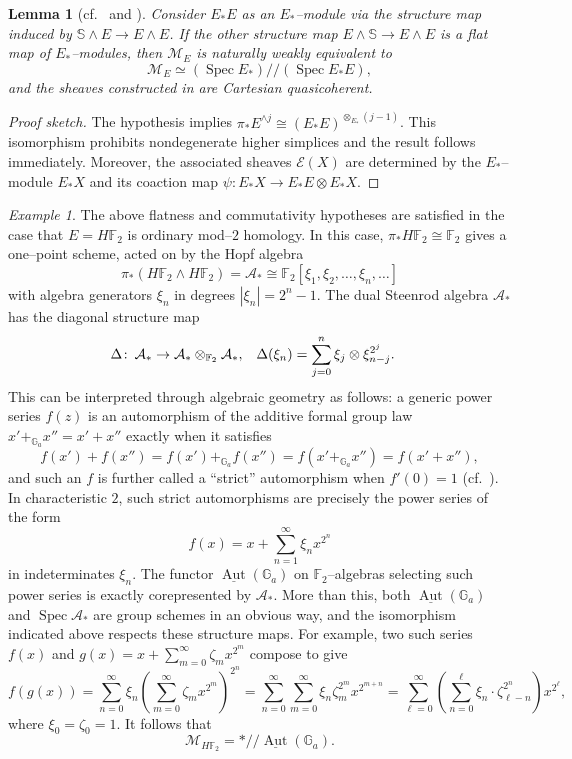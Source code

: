 \documentclass{amsart}
\renewcommand{\S}{\mathbb S}
\newcommand{\F}{\mathbb F}
\newcommand{\G}{\mathbb G}
\newcommand{\<}{\langle}
\renewcommand{\>}{\rangle}
\newcommand{\sm}{\wedge}
\newcommand{\mmod}{/\!\!/}
\newcommand{\co}{\colon\thinspace}
\newcommand{\sheaf}[1]{\mathcal{#1}}
\DeclareMathOperator{\Spec}{Spec}
\DeclareMathOperator{\Aut}{Aut}
\theoremstyle{plain}
\newtheorem*{lemma}{Lemma}
\theoremstyle{definition}
\theoremstyle{remark}
\newtheorem*{example}{Example}
\begin{document}
\begin{lemma}[{cf.\ \cite[Theorems 13.75 and 17.8]{Switzer} and \cite[Tag 07TP]{stacks-project}}]\label{FlatnessLemma}
Consider $E_* E$ as an $E_*$--module via the structure map induced by $\S \sm E \to E \sm E$.  If the other structure map $E \sm \S \to E \sm E$ is a flat map of $E_*$--modules, then $\mathcal{M}_E$ is naturally weakly equivalent to \[\mathcal{M}_E \simeq (\Spec E_*) \mmod (\Spec E_* E),\] and the sheaves constructed in  are \emph{Cartesian} quasicoherent.
\end{lemma}
\begin{proof}[Proof sketch]
The hypothesis implies $\pi_* E^{\sm j} \cong (E_* E)^{\otimes_{E_*} (j-1)}$.  This isomorphism prohibits nondegenerate higher simplices and the result follows immediately.  Moreover, the associated sheaves $\sheaf E(X)$ are determined by the $E_*$--module $E_* X$ and its coaction map $\psi: E_* X \to E_* E \otimes E_* X$.
\end{proof}

\begin{example}\label{HF2StackExample}
The above flatness and commutativity hypotheses are satisfied in the case that $E = H\F_2$ is ordinary mod--$2$ homology.  In this case, $\pi_* H\F_2 \cong \F_2$ gives a one--point scheme, acted on by the Hopf algebra \[\pi_* (H\F_2 \sm H\F_2) = \mathcal{A}_* \cong \F_2[\xi_1, \xi_2, \ldots, \xi_n, \ldots]\] with algebra generators $\xi_n$ in degrees $|\xi_n| = 2^n - 1$.  The dual Steenrod algebra $\mathcal{A}_*$ has the diagonal structure map~\cite[Theorem 3]{Milnor}
\begin{align*}
\Delta \co \mathcal{A}_* \to \mathcal{A}_* \otimes_{\F_2} \mathcal{A}_*, & & \Delta(\xi_n) & = \sum_{j=0}^n \xi_j \otimes \xi_{n-j}^{2^j}.
\end{align*}
This can be interpreted through algebraic geometry as follows: a generic power series $f(z)$ is an automorphism of the additive formal group law $x' +_{\G_a} x'' = x' + x''$ exactly when it satisfies \[f(x') + f(x'') = f(x') +_{\G_a} f(x'') = f\left( x' +_{\G_a} x'' \right) = f(x' + x''),\] and such an $f$ is further called a ``strict'' automorphism when $f'(0) = 1$ (cf.\ ).  In characteristic $2$, such strict automorphisms are precisely the power series of the form \[f(x) = x + \sum_{n=1}^\infty \xi_n x^{2^n}\] in indeterminates $\xi_n$.  The functor $\underline{\Aut}(\G_a)$ on $\F_2$--algebras selecting such power series is exactly corepresented by $\mathcal{A}_*$.  More than this, both $\underline{\Aut}(\G_a)$ and $\Spec \mathcal{A}_*$ are group schemes in an obvious way, and the isomorphism indicated above respects these structure maps.  For example, two such series $f(x)$ and $g(x) = x + \sum_{m=0}^\infty \zeta_m x^{2^m}$ compose to give
\[f(g(x)) = \sum_{n=0}^\infty \xi_n \left( \sum_{m=0}^\infty \zeta_m x^{2^m} \right)^{2^n} = \sum_{n=0}^\infty \sum_{m=0}^\infty \xi_n \zeta_m^{2^m} x^{2^{m+n}} = \sum_{\ell = 0}^\infty \left( \sum_{n=0}^\ell \xi_n \cdot \zeta_{\ell - n}^{2^n} \right) x^{2^\ell},\] where $\xi_0 = \zeta_0 = 1$.  It follows that \[\mathcal{M}_{H\F_2} = * \mmod \underline{\Aut}(\G_a).\]
\end{example}
\end{document}
